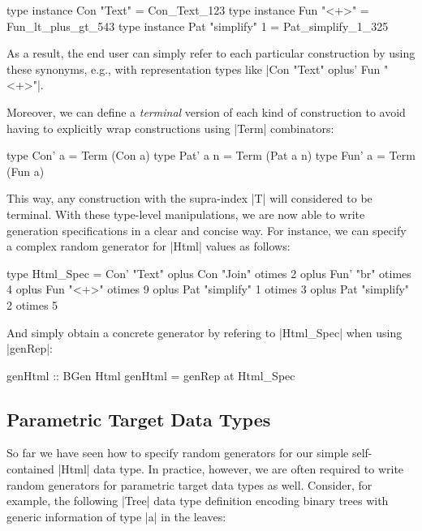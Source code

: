 \begin{code}
type instance Con "Text"        = Con_Text_123
type instance Fun "<+>"         = Fun_lt_plus_gt_543
type instance Pat "simplify" 1  = Pat_simplify_1_325
\end{code}

As a result, the end user can simply refer to each particular construction by
using these synonyms, e.g., with representation types like |Con "Text" oplus'
Fun "<+>"|.


Moreover, we can define a \emph{terminal} version of each kind of construction
to avoid having to explicitly wrap constructions using |Term| combinators:

\begin{code}
type Con' a    = Term  (Con a)
type Pat' a n  = Term  (Pat a n)
type Fun' a    = Term  (Fun a)
\end{code}

This way, any construction with the supra-index |T| will considered to be
terminal.
%
With these type-level manipulations, we are now able to write generation
specifications in a clear and concise way.
%
For instance, we can specify a complex random generator for |Html| values as
follows:

\begin{code}
type Html_Spec
  =      Con'  "Text"
  oplus  Con   "Join"         otimes 2
  oplus  Fun'  "br"           otimes 4
  oplus  Fun   "<+>"          otimes 9
  oplus  Pat   "simplify"  1  otimes 3
  oplus  Pat   "simplify"  2  otimes 5
\end{code}

And simply obtain a concrete generator by refering to |Html_Spec| when using
|genRep|:

\begin{code}
genHtml :: BGen Html
genHtml = genRep at Html_Spec
\end{code}


%
\subsection{Parametric Target Data Types }

So far we have seen how to specify random generators for our simple
self-contained |Html| data type.
%
In practice, however, we are often required to write random generators for
parametric target data types as well.
%
Consider, for example, the following |Tree| data type definition encoding binary
trees with generic information of type |a| in the leaves:


